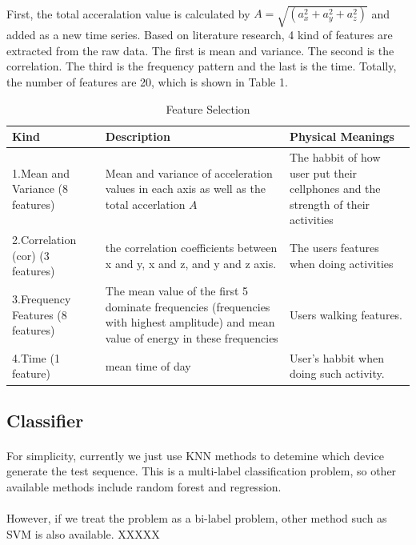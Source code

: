 \documentclass{article}
\begin{document}
		\paragraph{}First, the total acceralation value is calculated by $A=\sqrt{(a_x^2+a_y^2+a_z^2)}$ and added as a new time series. Based on literature research, 4 kind of features are extracted from the raw data. The first is mean and variance. The second is the correlation. The third is the frequency pattern and the last is the time. Totally, the number of features are 20, which is shown in Table 1. 
		\begin{table}
			\centering
			\caption{Feature Selection}
			\begin{tabular}{p{3cm}|p{6cm}|p{4cm}}
			Kind & Description & Physical Meanings \\ \hline
			1.Mean and Variance (8 features) & Mean and variance of acceleration values in each axis as well as the total accerlation $A$ & The habbit of how user put their cellphones and the strength of their activities \\ \hline
			2.Correlation (cor) (3 features) & the correlation coefficients between x and y, x and z, and y and z axis. & The users features when doing activities \\ \hline
			3.Frequency Features (8 features) & The mean value of the first 5 dominate frequencies (frequencies with highest amplitude) and mean value of energy in these frequencies & Users walking features.\\ \hline
			4.Time (1 feature) & mean time of day & User's habbit when doing such activity.
			\end{tabular}
		\end{table}

	
		\subsection{Classifier} %
		\label{sub:classifier}
		\paragraph{} For simplicity, currently we just use KNN methods to detemine which device generate the test sequence. This is a multi-label classification problem, so other available methods include random forest and regression. 
		
		\paragraph{} However, if we treat the problem as a bi-label problem, other method such as SVM is also available. XXXXX
	
\end{document}
